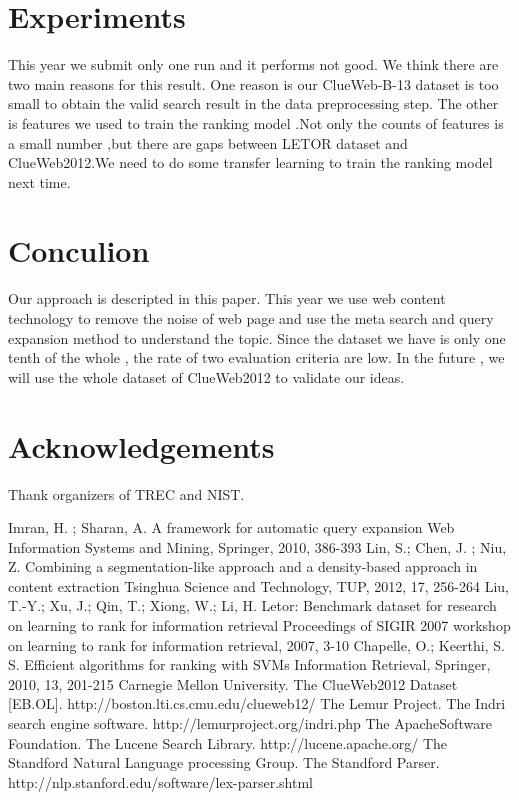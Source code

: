 \documentclass[runningheads,a4paper]{llncs}
\begin{document}
\section{Experiments}

This year we submit only one run and it performs not good. We think there are two main reasons for this result. One reason is our ClueWeb-B-13 dataset is too small to obtain the valid search result in the data preprocessing step. The other  is features we used to train the ranking model .Not only the counts of features is a small number ,but there are gaps between LETOR dataset and ClueWeb2012.We need to do some transfer learning  to train the ranking model next time.

\section{Conculion}

Our approach is descripted in this paper. This year we use web content technology to remove the noise of web page and use the meta search and query expansion method to understand the topic. Since the dataset we have is only one tenth of the whole ,  the rate of two evaluation criteria are low. In the future , we will use the whole dataset of ClueWeb2012 to validate our ideas.

\section{Acknowledgements}

Thank organizers of TREC and NIST.


\begin{thebibliography}{4}
Imran, H. ; Sharan, A. A framework for automatic query expansion Web Information Systems and Mining, Springer, 2010, 386-393
Lin, S.; Chen, J. ; Niu, Z. Combining a segmentation-like approach and a density-based approach in content extraction Tsinghua Science and Technology, TUP, 2012, 17, 256-264
Liu, T.-Y.; Xu, J.; Qin, T.; Xiong, W.; Li, H. Letor: Benchmark dataset for research on learning to rank for information retrieval Proceedings of SIGIR 2007 workshop on learning to rank for information retrieval, 2007, 3-10
Chapelle, O.; Keerthi, S. S. Efficient algorithms for ranking with SVMs Information Retrieval, Springer, 2010, 13, 201-215
 Carnegie Mellon University. The ClueWeb2012 Dataset [EB.OL]. http://boston.lti.cs.cmu.edu/clueweb12/
 The Lemur Project. The Indri search engine software. http://lemurproject.org/indri.php
 The ApacheSoftware Foundation. The Lucene Search Library. http://lucene.apache.org/
 The Standford Natural Language processing Group. The Standford Parser. http://nlp.stanford.edu/software/lex-parser.shtml
\end{thebibliography}
\end{document}
